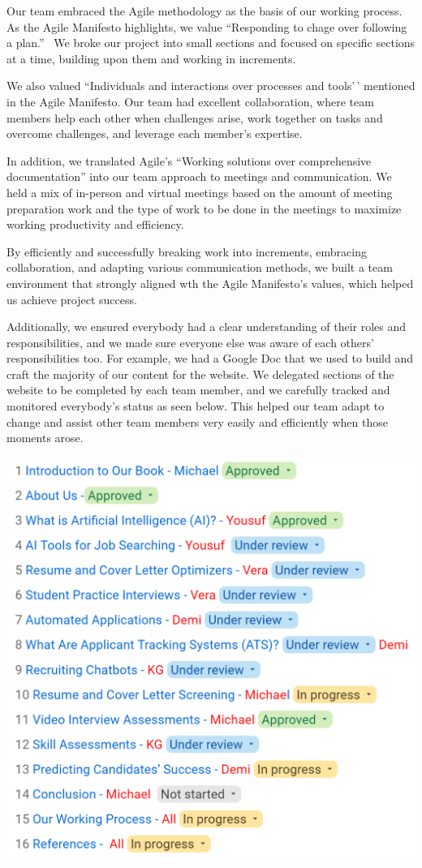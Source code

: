 \documentclass[
]{book}
\begin{document}
Our team embraced the Agile methodology as the basis of our working process. As the Agile Manifesto highlights, we value ``Responding to chage over following a plan.''~ We broke our project into small sections and focused on specific sections at a time, building upon them and working in increments.~

We also valued ``Individuals and interactions over processes and tools'\,' mentioned in the Agile Manifesto. Our team had excellent collaboration, where team members help each other when challenges arise, work together on tasks and overcome challenges, and leverage each member's expertise.

In addition, we translated Agile's ``Working solutions over comprehensive documentation'' into our team approach to meetings and communication. We held a mix of in-person and virtual meetings based on the amount of meeting preparation work and the type of work to be done in the meetings to maximize working productivity and efficiency.

By efficiently and successfully breaking work into increments, embracing collaboration, and adapting various communication methods, we built a team environment that strongly aligned wth the Agile Manifesto's values, which helped us achieve project success.

Additionally, we ensured everybody had a clear understanding of their roles and responsibilities, and we made sure everyone else was aware of each others' responsibilities too. For example, we had a Google Doc that we used to build and craft the majority of our content for the website. We delegated sections of the website to be completed by each team member, and we carefully tracked and monitored everybody's status as seen below. This helped our team adapt to change and assist other team members very easily and efficiently when those moments arose.

\includegraphics[width=5.52083in,height=\textheight]{work delegation.png}
\end{document}
